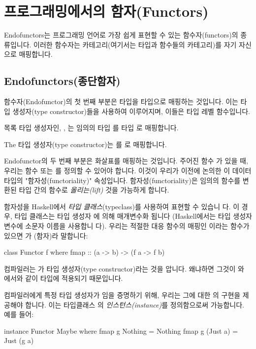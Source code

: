 \documentclass[DaoFP]{subfiles}
\begin{document}
\section{프로그래밍에서의 함자(Functors)}

Endofunctors는 프로그래밍 언어로 가장 쉽게 표현할 수 있는 함수자(functors)의 종류입니다. 이러한 함수자는 카테고리(여기서는 타입과 함수들의 카테고리)를 자기 자신으로 매핑합니다.

\subsection{Endofunctors(종단함자)}
함수자(Endofunctor)의 첫 번째 부분은 타입을 타입으로 매핑하는 것입니다. 이는 타입 생성자(type constructor)들을 사용하여 이루어지며, 이들은 타입 레벨 함수입니다.

목록 타입 생성자인, , 는 임의의 타입 를 타입 로 매핑합니다.

The  타입 생성자(type constructor)는 를 로 매핑합니다.

Endofunctor의 두 번째 부분은 화살표를 매핑하는 것입니다. 주어진 함수 가 있을 때, 우리는 함수  또는 를 정의할 수 있어야 합니다. 이것이 우리가 이전에 논의한 이 데이터 타입의 "함자성(functoriality)" 속성입니다. 함자성(functoriality)은 임의의 함수를 변환된 타입 간의 함수로 \emph{올리는(lift)} 것을 가능하게 합니다.

함자성을 Haskell에서 \emph{타입 클래스}(typeclass)를 사용하여 표현할 수 있습니 다. 이 경우, 타입 클래스는 타입 생성자 에 의해 매개변수화 됩니다 (Haskell에서는 타입 생성자 변수에 소문자 이름을 사용합니 다). 우리는 적절한 대응 함수의 매핑인 이라는 함수가 있으면 가 (함자)라 말합니다:
\begin{haskell}
class Functor f where
  fmap :: (a -> b) -> (f a -> f b)
\end{haskell}
컴파일러는 가 타입 생성자(type constructor)라는 것을 압니다. 왜냐하면 그것이 와 에서와 같이 타입에 적용되기 때문입니다.

컴파일러에게 특정 타입 생성자가 임을 증명하기 위해, 우리는 그에 대한 의 구현을 제공해야 합니다. 이는 타입클래스 의 \emph{인스턴스(instance)}를 정의함으로써 가능합니다. 예를 들어:
\begin{haskell}
instance Functor Maybe where
  fmap g Nothing  = Nothing
  fmap g (Just a) = Just (g a)
\end{haskell}
\end{document}
